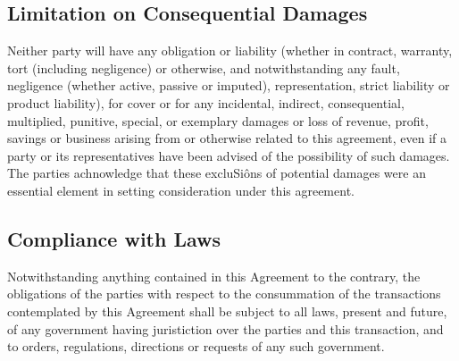 \documentclass[letterpaper,10pt,openany,oneside,english]{sphinxmanual}
\begin{document}
\subsection{Limitation on Consequential Damages}
\label{\detokenize{7-miscellaneous:limitation-on-consequential-damages}}
Neither party will have any obligation or liability (whether in contract, warranty, tort (including negligence) or otherwise, and notwithstanding any fault, negligence (whether active, passive or imputed), representation, strict liability or product liability), for cover or for any incidental, indirect, consequential, multiplied, punitive, special, or exemplary damages or loss of revenue, profit, savings or business arising from or otherwise related to this agreement, even if a party or its representatives have been advised of the possibility of such damages. The parties achnowledge that these excluSiôns of potential damages were an essential element in setting consideration under this agreement.


\subsection{Compliance with Laws}
\label{\detokenize{7-miscellaneous:compliance-with-laws}}
Notwithstanding anything contained in this Agreement to the contrary, the obligations of the parties with respect to the consummation of the transactions contemplated by this Agreement shall be subject to all laws, present and future, of any government having juristiction over the parties and this transaction, and to orders, regulations, directions or requests of any such government.
\end{document}
